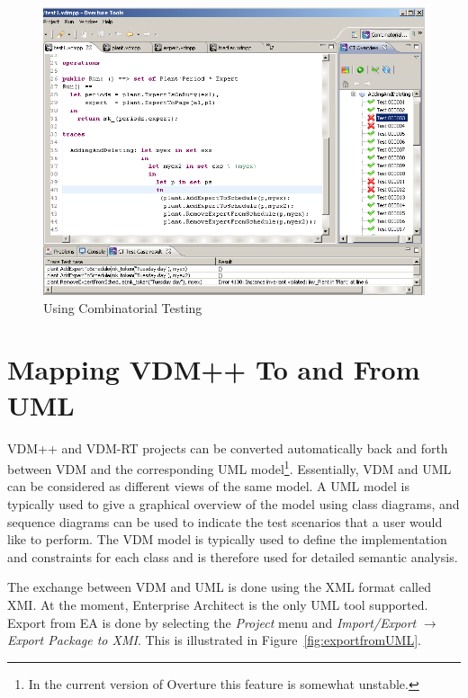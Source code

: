 \documentclass{overturerepchap}
\begin{document}
\begin{figure}[htbp]
\begin{center}
\includegraphics[width=4.5in]{screenDumps/tracesalarm}
\caption{Using Combinatorial Testing\label{fig:tracesalarm}}
\end{center}
\end{figure}

\chapter{Mapping VDM++ To and From UML}\label{sec:vdmuml}

VDM++ and VDM-RT projects can be converted automatically back and forth between VDM
and the corresponding UML model\footnote{In the current version of
Overture this feature is somewhat unstable.}. 
Essentially, VDM and UML can be considered
as different views of the same model. A UML model is typically used
to give a graphical overview of the model using class diagrams, and
sequence diagrams can be used to indicate the test scenarios
that a user would like to perform. The VDM model is typically used
to define the implementation and constraints for each class and
is therefore used for detailed semantic analysis.

The exchange between VDM and
UML is done using the XML format called XMI. At the moment,
Enterprise Architect is the only UML tool
supported. Export from EA is done by selecting the \emph{Project} menu
and \emph{Import/Export} $\rightarrow$ \emph{Export Package
to XMI}. This is illustrated in Figure~\ref{fig:exportfromUML}.
\end{document}

